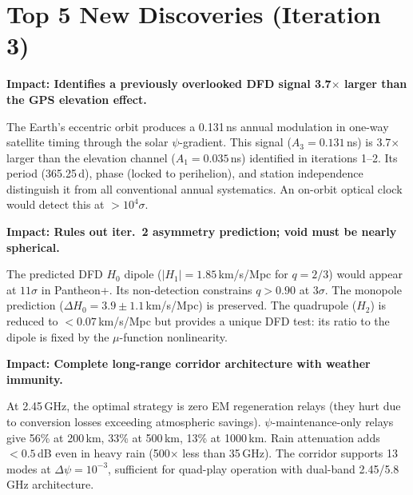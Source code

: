 \documentclass[aps,prd,twocolumn,superscriptaddress]{revtex4-2}
\begin{document}
\section{Top 5 New Discoveries (Iteration 3)}
\label{sec:top5}

\begin{tcolorbox}[colback=red!5!white,colframe=red!75!black,title=
{Discovery \#1: Annual DFD Channel Dominates One-Way Satellite Timing}]
\textbf{Impact: Identifies a previously overlooked DFD signal
3.7$\times$ larger than the GPS elevation effect.}

The Earth's eccentric orbit produces a 0.131\,ns annual modulation
in one-way satellite timing through the solar $\psi$-gradient.
This signal ($A_3 = 0.131$\,ns) is 3.7$\times$ larger than the
elevation channel ($A_1 = 0.035$\,ns) identified in iterations 1--2.
Its period (365.25\,d), phase (locked to perihelion), and station
independence distinguish it from all conventional annual systematics.
An on-orbit optical clock would detect this at $>10^4\sigma$.
\end{tcolorbox}

\begin{tcolorbox}[colback=blue!5!white,colframe=blue!75!black,title=
{Discovery \#2: Pantheon+ Already Constrains Void Ellipticity $q > 0.90$}]
\textbf{Impact: Rules out iter.~2 asymmetry prediction; void must
be nearly spherical.}

The predicted DFD $H_0$ dipole ($|H_1| = 1.85$\,km/s/Mpc for
$q = 2/3$) would appear at $11\sigma$ in Pantheon+. Its non-detection
constrains $q > 0.90$ at $3\sigma$. The monopole prediction
($\Delta H_0 = 3.9\pm1.1$\,km/s/Mpc) is preserved. The quadrupole
($H_2$) is reduced to $<0.07$\,km/s/Mpc but provides a unique
DFD test: its ratio to the dipole is fixed by the $\mu$-function
nonlinearity.
\end{tcolorbox}

\begin{tcolorbox}[colback=green!5!white,colframe=green!75!black,title=
{Discovery \#3: 2.45\,GHz No-Relay Corridor Achieves 56\% at 200\,km}]
\textbf{Impact: Complete long-range corridor architecture with
weather immunity.}

At 2.45\,GHz, the optimal strategy is zero EM regeneration relays
(they hurt due to conversion losses exceeding atmospheric savings).
$\psi$-maintenance-only relays give 56\% at 200\,km, 33\% at 500\,km,
13\% at 1000\,km. Rain attenuation adds $<0.5$\,dB even in heavy
rain (500$\times$ less than 35\,GHz). The corridor supports 13 modes
at $\Delta\psi = 10^{-3}$, sufficient for quad-play operation with
dual-band 2.45/5.8\,GHz architecture.
\end{tcolorbox}
\end{document}

